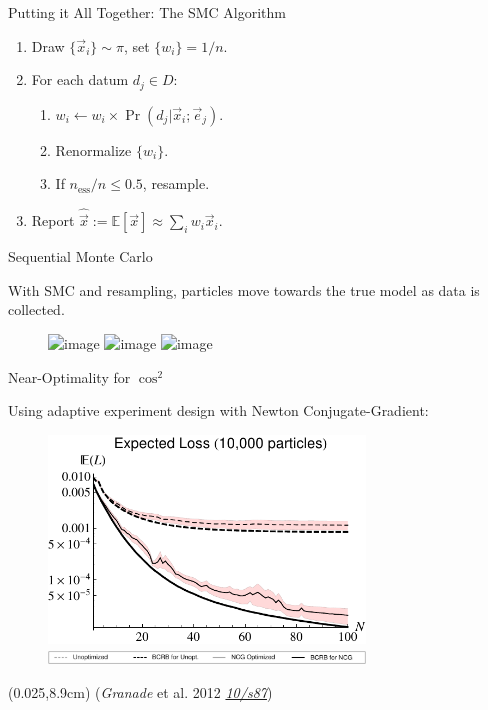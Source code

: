 \documentclass[xcolor=dvipsnames, compress]{beamer}
\renewcommand\UrlFont{\color{red}\rmfamily\itshape}
\newcommand{\shortdoi}[1]{\href{http://doi.org/#1}{\UrlFont 10/#1}}
\newcommand{\expect}{\mathbb{E}}
\newcommand{\defeq}{\mathrel{:=}}
\newcommand{\bottomnote}[1]{
  \begin{textblock*}{0.95\paperwidth} (0.025\paperwidth,8.9cm)
    {\tiny \hfill #1}
  \end{textblock*}
}
\begin{document}
\begin{frame}{Putting it All Together: The SMC Algorithm}

  \begin{enumerate}
    \item Draw $\{\vec{x}_i\} \sim \pi$, set $\{w_i\} = 1/n$.
    \item For each datum $d_j \in D$:
    \begin{enumerate}
      \item $w_i \gets w_i \times \Pr(d_j | \vec{x}_i; \vec{e}_j)$.
      \item Renormalize $\{w_i\}$.
      \item If $n_{\text{ess}} / n \le 0.5$, resample.
    \end{enumerate}
    \item Report $\hat{\vec{x}} \defeq \expect[\vec{x}] \approx \sum_i w_i \vec{x}_i$.
  \end{enumerate}

\end{frame}

\begin{frame}{Sequential Monte Carlo}
  
  With SMC and resampling, particles move towards the true model as data is collected.
  
  \begin{figure}
    \includegraphics<1>[width=0.6\textwidth]{1D_SMC_1_v2}
    \includegraphics<2>[width=0.6\textwidth]{1D_SMC_6_v2}
    \includegraphics<3>[width=0.6\textwidth]{1D_SMC_11_v2}
  \end{figure}
  
\end{frame}

\begin{frame}{Near-Optimality for $\cos^2$}

  Using adaptive experiment design with Newton Conjugate-Gradient:

  \begin{figure}
    \centering
    \includegraphics[width=0.75\textwidth]{knownT2-10000-particles-mse} \\
    \includegraphics[width=0.75\textwidth]{knownT2-n-particles-mse-legend}
  \end{figure}

  \bottomnote{(\emph{Granade} et al. 2012 \shortdoi{s87})}

\end{frame}
\end{document}
